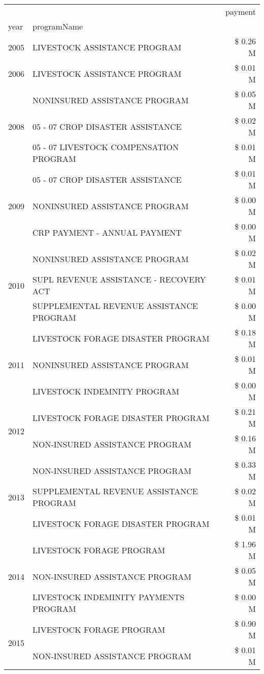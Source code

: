 \begin{tabular}{llr}
\toprule
 &  & payment \\
year & programName &  \\
\midrule
2005 & LIVESTOCK ASSISTANCE PROGRAM & \$ 0.26 M \\
\cline{1-3}
2006 & LIVESTOCK ASSISTANCE PROGRAM & \$ 0.01 M \\
\cline{1-3}
\multirow[t]{3}{*}{2008} & NONINSURED ASSISTANCE PROGRAM & \$ 0.05 M \\
 & 05 - 07 CROP DISASTER ASSISTANCE & \$ 0.02 M \\
 & 05 - 07 LIVESTOCK COMPENSATION PROGRAM & \$ 0.01 M \\
\cline{1-3}
\multirow[t]{3}{*}{2009} & 05 - 07 CROP DISASTER ASSISTANCE & \$ 0.01 M \\
 & NONINSURED ASSISTANCE PROGRAM & \$ 0.00 M \\
 & CRP PAYMENT - ANNUAL PAYMENT & \$ 0.00 M \\
\cline{1-3}
\multirow[t]{3}{*}{2010} & NONINSURED ASSISTANCE PROGRAM & \$ 0.02 M \\
 & SUPL REVENUE ASSISTANCE - RECOVERY ACT & \$ 0.01 M \\
 & SUPPLEMENTAL REVENUE ASSISTANCE PROGRAM & \$ 0.00 M \\
\cline{1-3}
\multirow[t]{3}{*}{2011} & LIVESTOCK FORAGE DISASTER PROGRAM & \$ 0.18 M \\
 & NONINSURED ASSISTANCE PROGRAM & \$ 0.01 M \\
 & LIVESTOCK INDEMNITY PROGRAM & \$ 0.00 M \\
\cline{1-3}
\multirow[t]{2}{*}{2012} & LIVESTOCK FORAGE DISASTER PROGRAM & \$ 0.21 M \\
 & NON-INSURED ASSISTANCE PROGRAM & \$ 0.16 M \\
\cline{1-3}
\multirow[t]{3}{*}{2013} & NON-INSURED ASSISTANCE PROGRAM & \$ 0.33 M \\
 & SUPPLEMENTAL REVENUE ASSISTANCE PROGRAM & \$ 0.02 M \\
 & LIVESTOCK FORAGE DISASTER PROGRAM & \$ 0.01 M \\
\cline{1-3}
\multirow[t]{3}{*}{2014} & LIVESTOCK FORAGE PROGRAM & \$ 1.96 M \\
 & NON-INSURED ASSISTANCE PROGRAM & \$ 0.05 M \\
 & LIVESTOCK INDEMINITY PAYMENTS PROGRAM & \$ 0.00 M \\
\cline{1-3}
\multirow[t]{3}{*}{2015} & LIVESTOCK FORAGE PROGRAM & \$ 0.90 M \\
 & NON-INSURED ASSISTANCE PROGRAM & \$ 0.01 M \\

\end{tabular}
